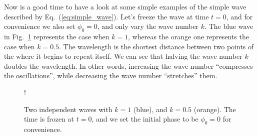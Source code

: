Now is a good time to have a look at some simple examples of the simple wave described by Eq.~(\ref{eq:simple_wave}).
Let's freeze the wave at time $t=0$, and for convenience we also set $\phi_0 = 0$, and only vary the wave number $k$.
The blue wave in Fig.~\ref{fig:two-waves} represents the case when $k=1$, whereas the orange one represents the case when $k=0.5$.
The wavelength is the shortest distance between two points of the where it begins to repeat itself.
We can see that halving the wave number $k$ doubles the wavelength.
In other words, increasing the wave number ``compresses the oscillations'', while decreasing the wave number ``stretches'' them.

\begin{figure}[t]
    \centering
    \resizebox {0.6\textwidth} {!} {
    }
    \caption[Same frequency, different wave numbers.]{Two independent waves with $k=1$ (blue), and $k=0.5$ (orange). The time is frozen at $t=0$, and we set the initial phase to be $\phi_0=0$ for convenience.}    
    \label{fig:two-waves}
\end{figure}

